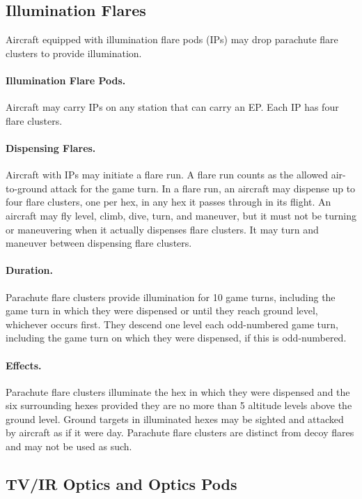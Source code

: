 \begin{advancedrules}
{}{

\subsection{Illumination Flares}

Aircraft equipped with illumination flare pods (IPs) may drop parachute flare clusters to provide illumination.

\paragraph{Illumination Flare Pods.} Aircraft may carry IPs on any station that can carry an EP. Each IP has four flare clusters.  

\paragraph{Dispensing Flares.} Aircraft with IPs may initiate a flare run. A flare run counts as the allowed air-to-ground attack for the game turn. In a flare run, an aircraft may dispense up to four flare clusters, one per hex, in any hex it passes through in its flight. An aircraft may fly level, climb, dive, turn, and maneuver, but it must not be turning or maneuvering when it actually dispenses flare clusters. It may turn and maneuver between dispensing flare clusters.

\paragraph{Duration.} Parachute flare clusters provide illumination for 10 game turns, including the game turn in which they were dispensed or until they reach ground level, whichever occurs first. They descend one level each odd-numbered game turn, including the game turn on which they were dispensed, if this is odd-numbered.

\paragraph{Effects.} 
Parachute flare clusters illuminate the hex in which they were dispensed and the six surrounding hexes provided they are no more than 5 altitude levels above the ground level. Ground targets in illuminated hexes may be sighted and attacked by aircraft as if it were day. Parachute flare clusters are distinct from decoy flares and may not be used as such.

\subsection{TV/IR Optics and Optics Pods}

}
\end{advancedrules}
